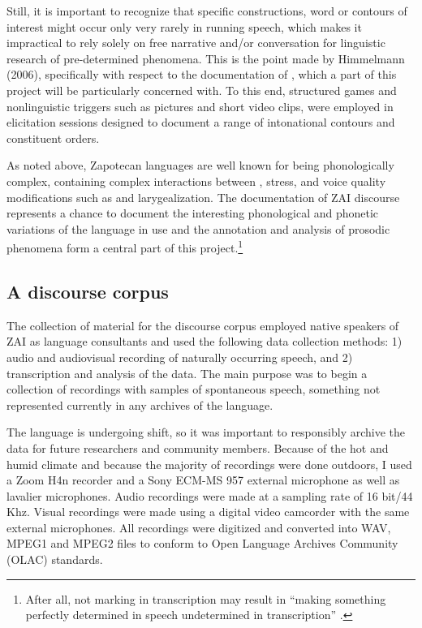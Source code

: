 Still, it is important to recognize that specific constructions, word or  contours of interest might occur only very rarely in running speech, which makes it impractical to rely solely on free narrative and/or conversation for linguistic research of pre-determined phenomena. This is the point made by Himmelmann (2006), specifically with respect to the documentation of , which a part of this project will be particularly concerned with. To this end, structured games and nonlinguistic triggers such as pictures and short video clips, were employed in elicitation sessions designed to document a range of intonational contours and constituent orders.

As noted above, Zapotecan languages are well known for being phonologically complex, containing complex interactions between , stress, and voice quality modifications such as  and larygealization. The documentation of ZAI discourse represents a chance to document the interesting phonological and phonetic variations of the language in use and the annotation and analysis of prosodic phenomena form a central part of this project.\footnote{After all, not marking  in transcription may result in ``making something perfectly determined in speech undetermined in transcription'' \citep[57]{scarano2009}.}  



\subsection{A discourse corpus}

The collection of material for the discourse corpus employed native speakers of ZAI as language consultants and used the following data collection methods: 1) audio and audiovisual recording of naturally occurring speech, and 2) transcription and analysis of the data. The main purpose was to begin a collection of recordings with samples of spontaneous speech, something not represented currently in any archives of the language. 

The language is undergoing shift, so it was important to responsibly archive the data for future researchers and community members. Because of the hot and humid climate and because the majority of recordings were done outdoors, I used a Zoom H4n recorder and a Sony ECM-MS 957 external microphone as well as lavalier microphones. Audio recordings were made at a sampling rate of 16 bit/44 Khz. Visual recordings were made using a digital video camcorder with the same external microphones. All recordings were digitized and converted into WAV, MPEG1 and MPEG2 files to conform to Open Language Archives Community (OLAC) standards. 

